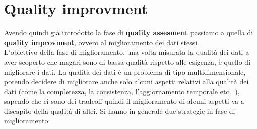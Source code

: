 \documentclass[a4paper,12pt, oneside]{book}
\begin{document}
\section{Quality improvment}
Avendo quindi già introdotto la fase di \textbf{quality assesment} passiamo a
quella di \textbf{quality improvment}, ovvero al miglioramento dei dati
stessi.\\
L'obiettivo della fase di miglioramento, una volta misurata la qualità dei dati
a aver scoperto che magari sono di bassa qualità rispetto alle esigenza,
è quello di migliorare i dati. La qualità dei dati è un problema di tipo
multidimensionale, potendo decidere di migliorare anche solo alcuni aspetti
relativi alla qualità dei dati (come la completezza, la consistenza,
l'aggiornamento temporale etc$\ldots$), sapendo che ci sono dei tradeoff quindi
il miglioramento di alcuni aspetti va a discapito della qualità di altri. Si
hanno in generale due strategie in fase di miglioramento: 
\end{document}
